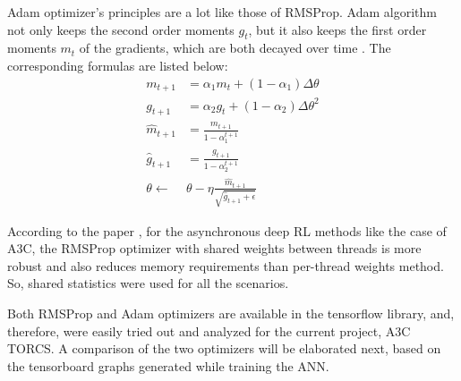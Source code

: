 Adam optimizer's principles are a lot like those of RMSProp. Adam algorithm not only keeps the second order moments $g_{t}$, but it also keeps the first order moments $m_{t}$ of the gradients, which are both decayed over time \cite{Optimizers}. The corresponding formulas are listed below:
\begin{equation}\label{Adam}
\begin{aligned}
m_{t+1}&=\alpha_{1} m_{t} + (1-\alpha_{1})\Delta \theta\\
g_{t+1}&=\alpha_{2} g_{t} + (1-\alpha_{2})\Delta \theta^2\\
\hat{m}_{t+1}&=\frac{m_{t+1}}{1-\alpha_{1}^{t+1}}  \\
\hat{g}_{t+1}&=\frac{g_{t+1}}{1-\alpha_{2}^{t+1}}  \\
\theta \leftarrow & \theta - \eta  \frac{\hat{m}_{t+1}}{\sqrt{\hat{g}_{t+1}+\epsilon}}
\end{aligned}
\end{equation}

According to the paper \cite{DBLP:journals/corr/MnihBMGLHSK16}, for the asynchronous deep RL methods like the case of A3C, the RMSProp optimizer with shared weights between threads is more robust and also reduces memory requirements than per-thread weights method. So, shared statistics were used for all the scenarios.

Both RMSProp and Adam optimizers are available in the tensorflow library, and, therefore, were easily tried out and analyzed for the current project, A3C TORCS. A comparison of the two optimizers will be elaborated next, based on the tensorboard graphs generated while training the ANN.

